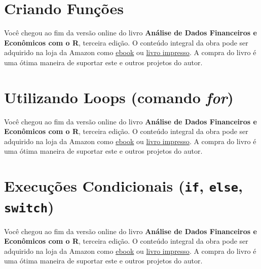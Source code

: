 \documentclass[
  11pt,
]{book}
\newenvironment{pleasebuyit}
{\begin{noteblock}
		
	} {\end{noteblock}}
\begin{document}
\hypertarget{criando-funuxe7uxf5es}{%
\section{Criando Funções}\label{criando-funuxe7uxf5es}}

\begin{pleasebuyit}
Você chegou ao fim da versão online do livro \textbf{Análise de Dados
Financeiros e Econômicos com o R}, terceira edição. O conteúdo integral
da obra pode ser adquirido na loja da Amazon como
\href{https://www.amazon.com.br/dp/B08WNC27ZY}{ebook} ou
\href{https://www.amazon.com/dp/B08WP8CCDB}{livro impresso}. A compra do
livro é uma ótima maneira de suportar este e outros projetos do autor.
\end{pleasebuyit}

\hypertarget{loops}{%
\section{\texorpdfstring{Utilizando Loops (comando \emph{for})}{Utilizando Loops (comando for)}}\label{loops}}

\begin{pleasebuyit}
Você chegou ao fim da versão online do livro \textbf{Análise de Dados
Financeiros e Econômicos com o R}, terceira edição. O conteúdo integral
da obra pode ser adquirido na loja da Amazon como
\href{https://www.amazon.com.br/dp/B08WNC27ZY}{ebook} ou
\href{https://www.amazon.com/dp/B08WP8CCDB}{livro impresso}. A compra do
livro é uma ótima maneira de suportar este e outros projetos do autor.
\end{pleasebuyit}

\hypertarget{execuuxe7uxf5es-condicionais-if-else-switch}{%
\section{\texorpdfstring{Execuções Condicionais (\texttt{if}, \texttt{else}, \texttt{switch})}{Execuções Condicionais (if, else, switch)}}\label{execuuxe7uxf5es-condicionais-if-else-switch}}

\begin{pleasebuyit}
Você chegou ao fim da versão online do livro \textbf{Análise de Dados
Financeiros e Econômicos com o R}, terceira edição. O conteúdo integral
da obra pode ser adquirido na loja da Amazon como
\href{https://www.amazon.com.br/dp/B08WNC27ZY}{ebook} ou
\href{https://www.amazon.com/dp/B08WP8CCDB}{livro impresso}. A compra do
livro é uma ótima maneira de suportar este e outros projetos do autor.
\end{pleasebuyit}
\end{document}
